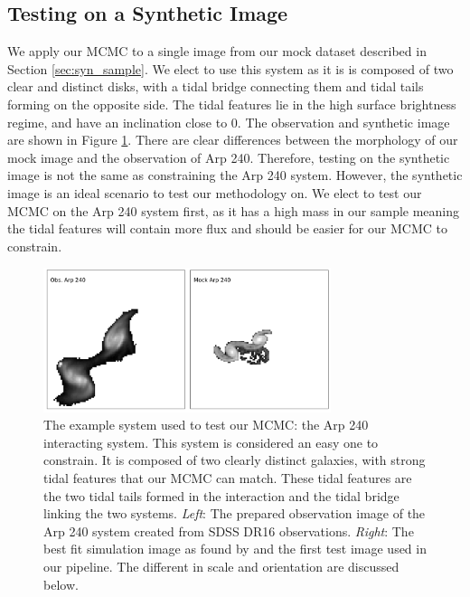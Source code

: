 \subsection{Testing on a Synthetic Image}
We apply our MCMC to a single image from our mock dataset described in Section \ref{sec:syn_sample}. We elect to use this system as it is is composed of two clear and distinct disks, with a tidal bridge connecting them and tidal tails forming on the opposite side. The tidal features lie in the high surface brightness regime, and have an inclination close to 0. The observation and synthetic image are shown in Figure \ref{fig:arp240}. There are clear differences between the morphology of our mock image and the observation of Arp 240. Therefore, testing on the synthetic image is not the same as constraining the Arp 240 system. However, the synthetic image is an ideal scenario to test our methodology on. We elect to test our MCMC on the Arp 240 system first, as it has a high mass in our sample meaning the tidal features will contain more flux and should be easier for our MCMC to constrain.

\begin{figure}
    \centering
    \includegraphics[width=0.75\textwidth]{Chapter1/figures/arp240-obs-sim.pdf}
    \caption[The example system used to test our MCMC: the Arp 240 interacting system.]{The example system used to test our MCMC: the Arp 240 interacting system. This system is considered an easy one to constrain. It is composed of two clearly distinct galaxies, with strong tidal features that our MCMC can match. These tidal features are the two tidal tails formed in the interaction and the tidal bridge linking the two systems. \textit{Left}: The prepared observation image of the Arp 240 system created from SDSS DR16 observations. \textit{Right}: The best fit simulation image as found by \citet{2016MNRAS.459..720H} and the first test image used in our pipeline. The different in scale and orientation are discussed below.}
    \label{fig:arp240}
\end{figure}

